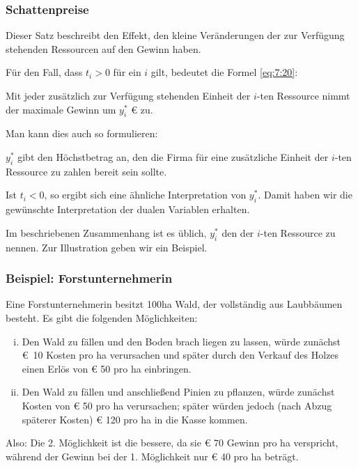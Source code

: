 \documentclass[smaller]{beamer}
\begin{document}
\begin{frame}
 \frametitle{Schattenpreise}
 \alert{Dieser Satz beschreibt den Effekt, den kleine Veränderungen der zur Verfügung stehenden Ressourcen auf den Gewinn haben.} \\ \vspace*{0.2cm}

Für den Fall, dass $t_i > 0$  für ein $i$ gilt, bedeutet die Formel \eqref{eq:7:20}: \\ \vspace*{0.2cm}

\alert{Mit jeder zusätzlich zur Verfügung stehenden Einheit der $i$-ten Ressource nimmt der maximale Gewinn um $y_i^*$ {\euro} zu}.\\ \vspace*{0.2cm}

Man kann dies auch so formulieren:\\ \vspace*{0.2cm}

\alert{$y_i^*$ gibt den Höchstbetrag an, den die Firma für eine zusätzliche Einheit der $i$-ten Ressource zu zahlen bereit sein sollte.}\\ \vspace*{0.2cm}

Ist $t_i < 0$, so ergibt sich eine ähnliche Interpretation von $y_i^*$. Damit haben wir die gewünschte Interpretation der dualen Variablen erhalten.\\ \vspace*{0.2cm}

Im beschriebenen Zusammenhang ist es üblich, $y_i^*$ den  der $i$-ten Ressource zu nennen. Zur Illustration geben wir ein Beispiel.
\end{frame}

\begin{frame}
 \frametitle{Beispiel: Forstunternehmerin}
Eine Forstunternehmerin besitzt 100ha Wald, der vollständig aus Laub\-bäumen besteht. Es gibt die folgenden Möglichkeiten:
\begin{enumerate}[(i)]
\item Den Wald zu fällen und den Boden brach liegen zu lassen, würde zunächst \mbox{{\euro} 10} Kosten pro ha verursachen und später durch den Verkauf des Holzes einen Erlös von {\euro} 50 pro ha einbringen.
\item Den Wald zu fällen und anschließend Pinien zu pflanzen, würde zunächst Kosten von {\euro} 50 pro ha verursachen; später würden jedoch (nach Abzug späterer Kosten) {\euro} 120 pro ha in die Kasse kommen.
\end{enumerate}
Also: Die 2. Möglichkeit ist die bessere, da sie {\euro} 70 Gewinn pro ha verspricht, während der Gewinn bei der 1. Möglichkeit nur {\euro} 40 pro ha beträgt.
\end{frame}
\end{document}
